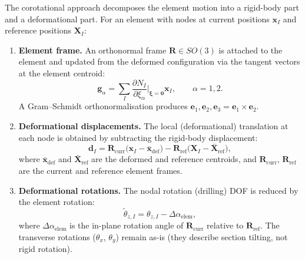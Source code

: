 The corotational approach decomposes the element motion into a
rigid-body part and a deformational part.  For an element with
nodes at current positions $\mathbf{x}_I$ and reference positions
$\mathbf{X}_I$:

\begin{enumerate}
  \item \textbf{Element frame.} An orthonormal frame
        $\mathbf{R} \in SO(3)$ is attached to the element and
        updated from the deformed configuration via the tangent
        vectors at the element centroid:
        \[
          \mathbf{g}_\alpha = \sum_I \frac{\partial N_I}{\partial \xi_\alpha}
          \bigg|_{\boldsymbol{\xi}=\mathbf{0}} \mathbf{x}_I
          ,\qquad \alpha = 1,2
          .
        \]
        A Gram--Schmidt orthonormalisation produces
        $\mathbf{e}_1, \mathbf{e}_2, \mathbf{e}_3 = \mathbf{e}_1 \times \mathbf{e}_2$.

  \item \textbf{Deformational displacements.} The local
        (deformational) translation at each node is obtained by
        subtracting the rigid-body displacement:
        \begin{equation}
          \mathbf{d}_I =
          \mathbf{R}_{\mathrm{curr}}
            \bigl(\mathbf{x}_I - \bar{\mathbf{x}}_{\mathrm{def}}\bigr)
          -
          \mathbf{R}_{\mathrm{ref}}
            \bigl(\mathbf{X}_I - \bar{\mathbf{X}}_{\mathrm{ref}}\bigr)
          ,
          \label{eq:cr-disp}
        \end{equation}
        where $\bar{\mathbf{x}}_{\mathrm{def}}$ and
        $\bar{\mathbf{X}}_{\mathrm{ref}}$ are the deformed and
        reference centroids, and $\mathbf{R}_{\mathrm{curr}}$,
        $\mathbf{R}_{\mathrm{ref}}$ are the current and reference
        element frames.

  \item \textbf{Deformational rotations.} The nodal rotation
        (drilling) DOF is reduced by the element rotation:
        \begin{equation}
          \tilde{\theta}_{z,I} = \theta_{z,I}
            - \Delta\alpha_{\mathrm{elem}}
          ,
          \label{eq:cr-drill}
        \end{equation}
        where $\Delta\alpha_{\mathrm{elem}}$ is the in-plane
        rotation angle of $\mathbf{R}_{\mathrm{curr}}$ relative
        to $\mathbf{R}_{\mathrm{ref}}$.  The transverse rotations
        ($\theta_x$, $\theta_y$) remain as-is (they describe
        section tilting, not rigid rotation).
\end{enumerate}

